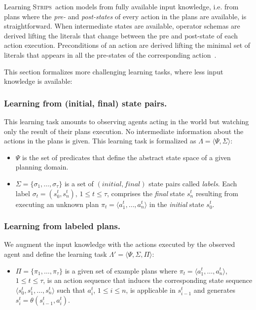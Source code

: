 \documentclass[letterpaper]{article} %
\newcommand{\tup}[1]{{\langle #1 \rangle}}
\newcommand{\strips}{\textsc{Strips}}     %
\begin{document}
Learning \strips\ action models from fully available input knowledge, i.e. from plans where the {\em pre-} and {\em post-states} of every action in the plans are available, is straightforward. When intermediate states are available, operator schemas are derived lifting the literals that change between the pre and post-state of each action execution. Preconditions of an action are derived lifting the minimal set of literals that appears in all the pre-states of the corresponding action~\cite{jimenez2012review}.

This section formalizes more challenging learning tasks, where less input knowledge is available:

\subsubsection{Learning from (initial, final) state pairs.} This learning task amounts to observing agents acting in the world but watching only the result of their plans execution. No intermediate information about the actions in the plans is given. This learning task is formalized as $\Lambda=\tup{\Psi,\Sigma}$:
\begin{itemize}
\item $\Psi$ is the set of predicates that define the abstract state space of a given planning domain.
\item $\Sigma=\{\sigma_1,\ldots,\sigma_{\tau}\}$ is a set of $(initial, final)$ state pairs called {\em labels}. Each label $\sigma_t=(s_0^t,s_{n}^t)$, {\tt\small $1\leq t\leq \tau$}, comprises the {\em final} state $s_{n}^t$ resulting from executing an unknown plan $\pi_t=\tup{a_1^t, \ldots, a_n^t}$ in the {\em initial} state $s_0^t$.
\end{itemize}

\subsubsection{Learning from labeled plans.}
We augment the input knowledge with the actions executed by the observed agent and define the learning task $\Lambda'=\tup{\Psi,\Sigma,\Pi}$:

\begin{itemize}
\item $\Pi=\{\pi_1,\ldots,\pi_{\tau}\}$ is a given set of example plans where $\pi_t=\tup{a_1^t, \ldots, a_n^t}$, {\small $1\leq t\leq \tau$}, is an action sequence that induces the corresponding state sequence $\tup{s_0^t, s_1^t, \ldots, s_n^t}$ such that $a_i^t$, {\small $1\leq i\leq n$}, is applicable in $s_{i-1}^t$ and generates $s_i^t=\theta(s_{i-1}^t,a_i^t)$.
\end{itemize}
\end{document}
